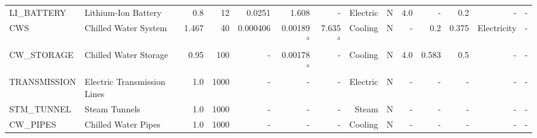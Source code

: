\begin{tabular}{llrrrrrrrrrrrr}
  LI\_BATTERY &         Lithium-Ion Battery &        0.8 &        12 &                  0.0251 &                   1.608 &                    - &      Electric &               N &                      4.0 &       - &                 0.2 &          - &                     - \\
         CWS &        Chilled Water System &      1.467 &        40 &                0.000406 &                0.00189$^\text{a}$ &                 7.635$^\text{a}$ & Cooling &               N &                      - &       0.2 &               0.375 &  Electricity &                     - \\
  CW\_STORAGE &       Chilled Water Storage &       0.95 &       100 &                     - &                0.00178$^\text{a}$ &                    - & Cooling &               N &                      4.0 &     0.583 &                 0.5 &          - &                     - \\
TRANSMISSION & Electric Transmission Lines &        1.0 &      1000 &                     - &                     - &                    - &      Electric &               N &                      - &       - &                 - &          - &                     - \\
  STM\_TUNNEL &               Steam Tunnels &        1.0 &      1000 &                     - &                     - &                    - &         Steam &               N &                      - &       - &                 - &          - &                     - \\
    CW\_PIPES &         Chilled Water Pipes &        1.0 &      1000 &                     - &                     - &                    - & Cooling &               N &                      - &       - &                 - &          - &                     - \\
\bottomrule
\end{tabular}
